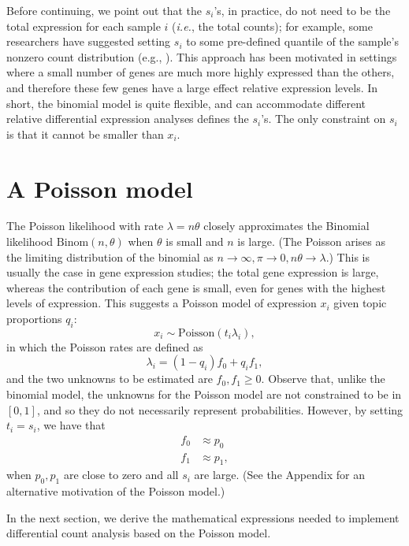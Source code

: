 \documentclass[final]{siamart171218}
\begin{document}
Before continuing, we point out that the $s_i$'s, in practice, do not
need to be the total expression for each sample $i$ ({\em i.e.}, the
total counts); for example, some researchers have suggested setting
$s_i$ to some pre-defined quantile of the sample's nonzero count
distribution (e.g., \cite{bullard-2010}). This approach has been
motivated in settings where a small number of genes are much more
highly expressed than the others, and therefore these few genes have a
large effect relative expression levels. In short, the binomial model
is quite flexible, and can accommodate different relative differential
expression analyses defines the $s_i$'s. The only constraint on $s_i$
is that it cannot be smaller than $x_i$.

\section{A Poisson model}

The Poisson likelihood with rate $\lambda = n\theta$ closely
approximates the Binomial likelihood $\mathrm{Binom}(n, \theta)$ when
$\theta$ is small and $n$ is large. (The Poisson arises as the
limiting distribution of the binomial as $n \rightarrow \infty, \pi
\rightarrow 0, n\theta \rightarrow \lambda$.) This is usually the case in
gene expression studies; the total gene expression is large, whereas
the contribution of each gene is small, even for genes with the
highest levels of expression. This suggests a Poisson model of
expression $x_i$ given topic proportions $q_i$:
\begin{equation}
x_i \sim \mathrm{Poisson}(t_i \lambda_i),
\label{eq:poisson}
\end{equation}
in which the Poisson rates are defined as
\begin{equation}
\lambda_i = (1 - q_i) f_0 + q_i f_1,
\end{equation}
and the two unknowns to be estimated are $f_0, f_1 \geq 0$. Observe
that, unlike the binomial model, the unknowns for the Poisson model
are not constrained to be in $[0, 1]$, and so they do not necessarily
represent probabilities. However, by setting $t_i = s_i$, we have that
\begin{align*}
f_0 &\approx p_0 \\
f_1 &\approx p_1,
\end{align*}
when $p_0, p_1$ are close to zero and all $s_i$ are large. (See the
Appendix for an alternative motivation of the Poisson model.)

In the next section, we derive the mathematical expressions needed to
implement differential count analysis based on the Poisson model.
\end{document}
